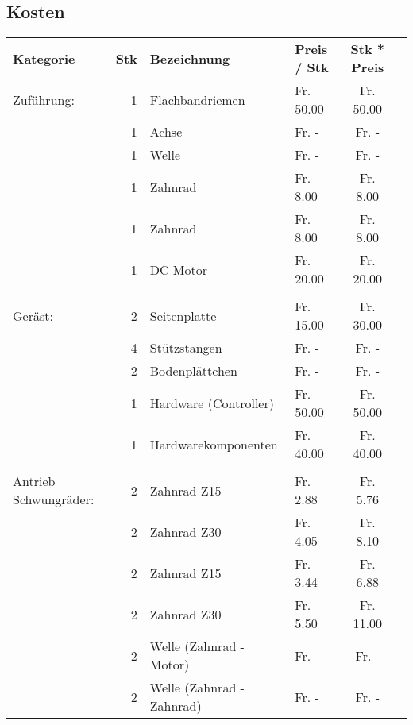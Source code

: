 \subsection{Kosten}

    \begin{longtable}{p{2cm}rllcc}
    \textbf{Kategorie} & \textbf{Stk} & \textbf{Bezeichnung} & \textbf{Preis / Stk} & \textbf{Stk * Preis} \\

    Zuführung: & 1     & Flachbandriemen 	&  Fr. 50.00  &  Fr. 50.00  \\
               & 1     & Achse          	&  Fr. -      &  Fr. -    \\
               & 1     & Welle           	&  Fr. -      &  Fr. -    \\
               & 1     & Zahnrad         	&  Fr. 8.00   &  Fr. 8.00  \\
               & 1     & Zahnrad         	&  Fr. 8.00   &  Fr. 8.00  \\
               & 1     & DC-Motor        	&  Fr. 20.00  &  Fr. 20.00  \\
               &       &                 	&             &  \\
       Geräst: & 2     & Seitenplatte    	&  Fr. 15.00  &  Fr. 30.00  \\
               & 4     & Stützstangen    	&  Fr. -      &  Fr. -    \\
               & 2     & Bodenplättchen  	&  Fr. -      &  Fr. -    \\
               & 1     & Hardware (Controller) &  Fr. 50.00  &  Fr. 50.00  \\
               & 1     & Hardwarekomponenten&  Fr. 40.00  &  Fr. 40.00  \\
               &       &       				&      		  &  \\
Antrieb Schwungräder:  & 2    & Zahnrad Z15 &  Fr. 2.88   &  Fr. 5.76  \\
               & 2     & Zahnrad Z30 		&  Fr.          4.05  &  Fr. 8.10  \\
               & 2     & Zahnrad Z15 		&  Fr.          3.44  &  Fr. 6.88  \\
               & 2     & Zahnrad Z30 		&  Fr.          5.50  &  Fr. 11.00  \\
               & 2     & Welle (Zahnrad - Motor) &  Fr. -    &  Fr. -    \\
               & 2     & Welle (Zahnrad - Zahnrad) &  Fr. -    &  Fr. -    \\

\end{longtable}
